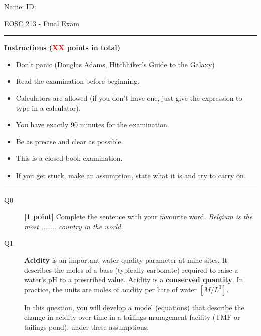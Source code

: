 \documentclass{article}
\begin{document}
\pagestyle{first}
\large{Name:} \hspace{11cm} \large{ID: }
\begin{center}
\Huge{EOSC 213 - Final Exam}
\end{center}

\rule{\textwidth}{1pt}

\large{\textbf{Instructions (\textcolor{red}{XX} points in total)}}
\begin{multicols}{2}
\begin{itemize}
\item Don't panic (Douglas Adams, Hitchhiker's Guide to the Galaxy)
\item Read the examination before beginning.
\item Calculators are allowed (if you don't have one, just give the expression to type in a calculator).
\item You have exactly 90 minutes for the examination.
\item Be as precise and clear as possible.
\item This is a closed book examination.
\item If you get stuck, make an assumption, state what it is and try to carry on.
\end{itemize} 
\end{multicols}



\rule{\textwidth}{1pt}

\begin{description}
\item [Q0]  \textbf{[1 point]} Complete the sentence with your favourite word. \textit{Belgium is the most ....... country in the world.} 
\vspace{0.25cm}

\end{description}


\begin{description}
\item[Q1] \textbf{Acidity} is an important water-quality parameter at mine sites. It describes the moles of a base (typically carbonate) required to raise a water's pH to a prescribed value. Acidity is a \textbf{conserved quantity}. In practice, the units are moles of acidity per litre of water $[M/L^3]$.   


In this question, you will develop a model (equations) that describe the change in acidity over time in a tailings management facility (TMF or tailings pond), under these assumptions:
\end{description}
\end{document}
